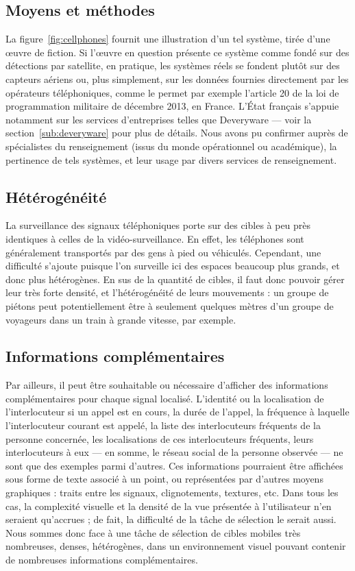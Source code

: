 	\FloatBarrier \subsection{Moyens et méthodes}
	La figure~\ref{fig:cellphones} fournit une illustration d'un tel système, tirée d'une œuvre de fiction. Si l'œuvre en question présente ce système comme fondé sur des détections par satellite, en pratique, les systèmes réels se fondent plutôt sur des capteurs aériens ou, plus simplement, sur les données fournies directement par les opérateurs téléphoniques, comme le permet par exemple l'article 20 de la loi de programmation militaire de décembre 2013, en France.\footnotemark{} L'État français s'appuie notamment sur les services d'entreprises telles que Deveryware --- voir la section~\ref{sub:deveryware} pour plus de détails. Nous avons pu confirmer auprès de spécialistes du renseignement (issus du monde opérationnel ou académique), la pertinence de tels systèmes, et leur usage par divers services de renseignement.

	
	\subsection{Hétérogénéité}
	La surveillance des signaux téléphoniques porte sur des cibles à peu près identiques à celles de la vidéo-surveillance. En effet, les téléphones sont généralement transportés par des gens à pied ou véhiculés. Cependant, une difficulté s'ajoute puisque l'on surveille ici des espaces beaucoup plus grands, et donc plus hétérogènes.	En sus de la quantité de cibles, il faut donc pouvoir gérer leur très forte densité, et l'hétérogénéité de leurs mouvements : un groupe de piétons peut potentiellement être à seulement quelques mètres d'un groupe de voyageurs dans un train à grande vitesse, par exemple.
	
	\subsection{Informations complémentaires}
	Par ailleurs, il peut être souhaitable ou nécessaire d'afficher des informations complémentaires pour chaque signal localisé. L'identité ou la localisation de l'interlocuteur si un appel est en cours, la durée de l'appel, la fréquence à laquelle l'interlocuteur courant est appelé, la liste des interlocuteurs fréquents de la personne concernée, les localisations de ces interlocuteurs fréquents, leurs interlocuteurs à eux — en somme, le réseau social de la personne observée — ne sont que des exemples parmi d'autres. Ces informations pourraient être affichées sous forme de texte associé à un point, ou représentées par d'autres moyens graphiques : traits entre les signaux, clignotements, textures, etc. Dans tous les cas, la complexité visuelle et la densité de la vue présentée à l'utilisateur n'en seraient qu'accrues ; de fait, la difficulté de la tâche de sélection le serait aussi. Nous sommes donc face à une tâche de sélection de cibles mobiles très nombreuses, denses, hétérogènes, dans un environnement visuel pouvant contenir de nombreuses informations complémentaires.
	
